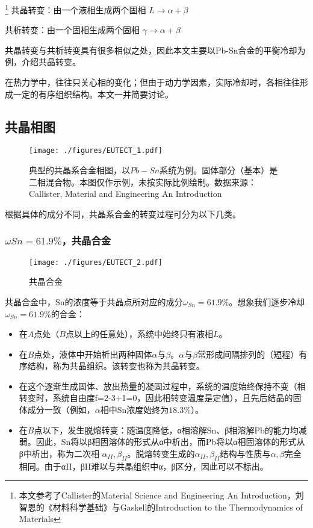 
\footnote{本文参考了Callister的Material Science and Engineering An Introduction，刘智恩的《材料科学基础》与Gaskell的Introduction to the Thermodynamics of Materials}
共晶转变：由一个液相生成两个固相 $L \rightarrow \alpha+\beta$

共析转变：由一个固相生成两个固相 $\gamma \rightarrow \alpha+\beta$

共晶转变与共析转变具有很多相似之处，因此本文主要以Pb-Sn合金的平衡冷却为例，介绍共晶转变。

在热力学中，往往只关心相的变化；但由于动力学因素，实际冷却时，各相往往形成一定的有序组织结构。本文一并简要讨论。

\subsection{共晶相图}
\begin{figure}[ht]
\centering
\texttt{[image: ./figures/EUTECT\_1.pdf]}
\caption{典型的共晶系合金相图，以$Pb-Sn$系统为例。固体部分（基本）是二相混合物。本图仅作示例，未按实际比例绘制。数据来源：Callister, Material and Engineering An Introduction} \label{EUTECT_fig1}
\end{figure}
根据具体的成分不同，共晶系合金的转变过程可分为以下几类。

\subsubsection{$\omega Sn=61.9\%$，共晶合金}
\begin{figure}[ht]
\centering
\texttt{[image: ./figures/EUTECT\_2.pdf]}
\caption{共晶合金} \label{EUTECT_fig2}
\end{figure}

共晶合金中，Sn的浓度等于共晶点所对应的成分$\omega_{Sn}=61.9\%$。想象我们逐步冷却$\omega_{Sn}=61.9\%$的合金：
\begin{itemize}
\item 在$A$点处（$B$点以上的任意处），系统中始终只有液相$L$。
\item 在$B$点处，液体中开始析出两种固体$\alpha$与$\beta$。$\alpha$与$\beta$常形成间隔排列的（短程）有序结构，称为共晶组织。该转变也称为共晶转变。
\item 在这个逐渐生成固体、放出热量的凝固过程中，系统的温度始终保持不变（相转变时，系统自由度f=2-3+1=0，因此相转变温度是定值），且先后结晶的固体成分一致（例如，$\alpha$相中Sn浓度始终为$18.3\%$）。
\item 在$B$点以下，发生脱熔转变：随温度降低，α相溶解Sn、β相溶解Pb的能力均减弱。因此，Sn将以β相固溶体的形式从α中析出，而Pb将以α相固溶体的形式从β中析出，称为二次相 $\alpha_{II},\beta_{II} $。脱熔转变生成的$\alpha_{II},\beta_{II} $结构与性质与$\alpha, \beta$完全相同。由于αII，βII难以与共晶组织中α，β区分，因此可以不标出。
\end{itemize}


